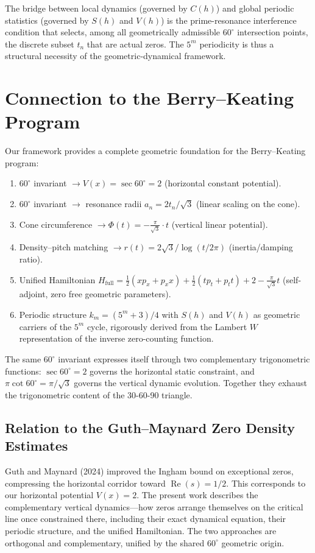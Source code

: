 \documentclass[12pt,a4paper]{article}
\begin{document}
The bridge between local dynamics (governed by $C(h)$) and global periodic statistics (governed by $S(h)$ and $V(h)$) is the prime-resonance interference condition that selects, among all geometrically admissible $60^\circ$ intersection points, the discrete subset $t_n$ that are actual zeros. The $5^m$ periodicity is thus a structural necessity of the geometric-dynamical framework.

\section{Connection to the Berry--Keating Program}

Our framework provides a complete geometric foundation for the Berry--Keating program:

\begin{enumerate}
\item $60^\circ$ invariant $\to V(x) = \sec 60^\circ = 2$ (horizontal constant potential).
\item $60^\circ$ invariant $\to$ resonance radii $a_n = 2t_n/\sqrt{3}$ (linear scaling on the cone).
\item Cone circumference $\to \Phi(t) = -\frac{\pi}{\sqrt{3}} \cdot t$ (vertical linear potential).
\item Density--pitch matching $\to r(t) = 2\sqrt{3}/\log(t/2\pi)$ (inertia/damping ratio).
\item Unified Hamiltonian $H_{\text{full}} = \frac{1}{2}(x p_x + p_x x) + \frac{1}{2}(t p_t + p_t t) + 2 - \frac{\pi}{\sqrt{3}}t$ (self-adjoint, zero free geometric parameters).
\item Periodic structure $k_m = (5^m+3)/4$ with $S(h)$ and $V(h)$ as geometric carriers of the $5^m$ cycle, rigorously derived from the Lambert $W$ representation of the inverse zero-counting function.
\end{enumerate}

The same $60^\circ$ invariant expresses itself through two complementary trigonometric functions: $\sec 60^\circ = 2$ governs the horizontal static constraint, and $\pi\cot 60^\circ = \pi/\sqrt{3}$ governs the vertical dynamic evolution. Together they exhaust the trigonometric content of the 30-60-90 triangle.

\subsection{Relation to the Guth--Maynard Zero Density Estimates}

Guth and Maynard (2024) \cite{guth-maynard} improved the Ingham bound on exceptional zeros, compressing the horizontal corridor toward $\operatorname{Re}(s)=1/2$. This corresponds to our horizontal potential $V(x)=2$. The present work describes the complementary vertical dynamics---how zeros arrange themselves on the critical line once constrained there, including their exact dynamical equation, their periodic structure, and the unified Hamiltonian. The two approaches are orthogonal and complementary, unified by the shared $60^\circ$ geometric origin.
\end{document}
